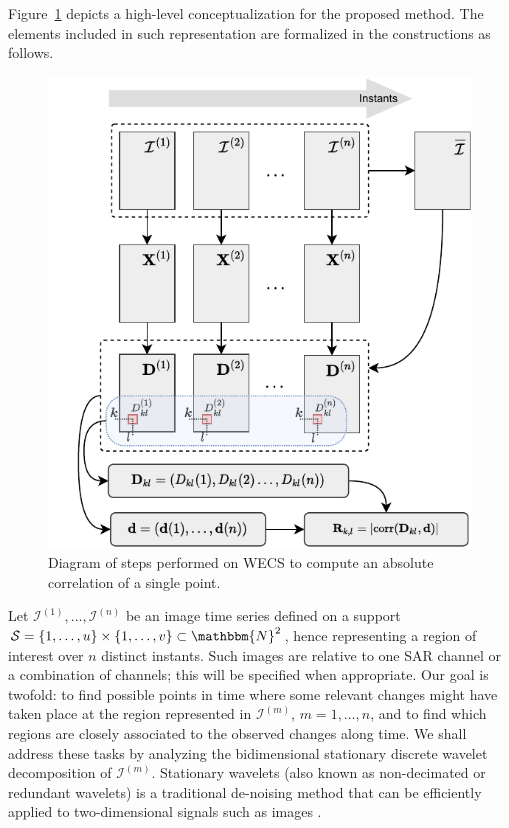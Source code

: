 \documentclass[journal]{IEEEtran}
\begin{document}
Figure~\ref{figDiagram} depicts a high-level conceptualization for the proposed method. The elements included in such representation are formalized in the constructions as follows.


\begin{figure}[htb!]
\centering
\includegraphics[scale=.8]{../../drawio/diagram_wecs.drawio_11nov21}
\caption{Diagram of steps performed on WECS to compute an absolute correlation of a single point.}
\label{figDiagram}
\end{figure}




Let $\mathcal{I}^{(1)},\ldots,\mathcal{I}^{(n)}$ be an image time series defined on a support $\mathcal{S} = \left\lbrace 1,\ldots,u  \right\rbrace \times \left\lbrace 1,\ldots,v  \right\rbrace \subset \mathbbm{N}^2$, hence representing a region of interest over $n$ distinct instants.
%
Such images are relative to one SAR channel or a combination of channels; this will be specified when appropriate. 
Our goal is twofold: to find possible points in time where some relevant changes might have taken place at the region represented in $\mathcal{I}^{(m)}$, $m=1,\ldots,n$, and to find which regions are closely associated to the observed changes along time. We shall address these tasks by analyzing the bidimensional stationary discrete wavelet decomposition of $\mathcal{I}^{(m)}$. Stationary wavelets (also known as non-decimated or redundant wavelets) is a traditional de-noising method that can be efficiently applied to two-dimensional signals such as images \cite{coifman1995translation,atto2012multidate,atto2016wavelet}. 
\end{document}
